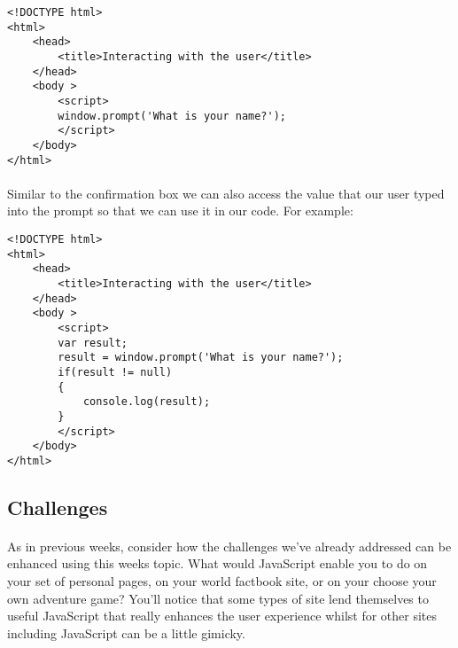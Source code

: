 \documentclass[10pt, a4paper]{article}
\begin{document}
\begin{lstlisting}
<!DOCTYPE html>
<html>
    <head>
        <title>Interacting with the user</title>
    </head>
    <body >
        <script>
        window.prompt('What is your name?');    
        </script>
    </body>
</html>
\end{lstlisting}

\paragraph{} Similar to the confirmation box we can also access the value that our user typed into the prompt so that we can use it in our code. For example:

\begin{lstlisting}
<!DOCTYPE html>
<html>
    <head>
        <title>Interacting with the user</title>
    </head>
    <body >
        <script>
        var result;
        result = window.prompt('What is your name?');
        if(result != null)
        {   
            console.log(result);
        }
        </script>
    </body>
</html>
\end{lstlisting}


\subsection{Challenges}
\paragraph{} As in previous weeks, consider how the challenges we've already addressed can be enhanced using this weeks topic. What would JavaScript enable you to do on your set of personal pages, on your world factbook site, or on your choose your own adventure game? You'll notice that some types of site lend themselves to useful JavaScript that really enhances the user experience whilst for other sites including JavaScript can be a little gimicky.
\end{document}
